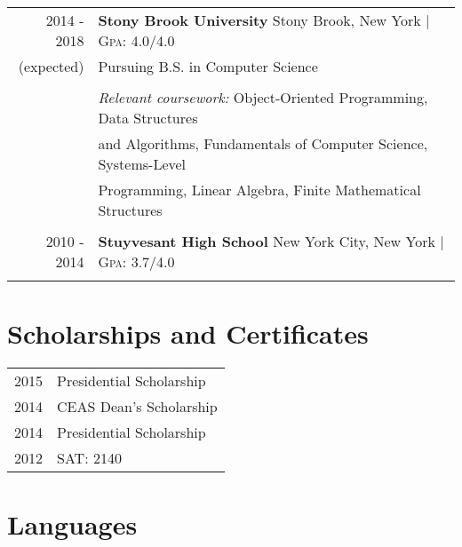 \documentclass[a4paper,10pt]{article} %
\begin{document}
\begin{tabular}{rl}	
\textsc{2014 - 2018} & \textbf{Stony Brook University} Stony Brook, New York | \normalsize \textsc{Gpa}: 4.0/4.0\\
\textsc(expected) & Pursuing B.S. in Computer Science\\
\\
& \textit{Relevant coursework:} Object-Oriented Programming, Data Structures\\
& and Algorithms, Fundamentals of Computer Science, Systems-Level\\
& Programming, Linear Algebra, Finite Mathematical Structures\\

&\\


\textsc{2010 - 2014} & \textbf{Stuyvesant High School} New York City, New York | \normalsize \textsc{Gpa}: 3.7/4.0\\
&\\

\end{tabular}


\section{Scholarships and Certificates}

\begin{tabular}{rl}
\textsc{2015} & Presidential Scholarship \normalsize\\

\textsc{2014} & CEAS Dean's Scholarship \normalsize\\

\textsc{2014} & Presidential Scholarship \normalsize\\

\textsc{2012} & SAT: 2140
\end{tabular}


\section{Languages}
\end{document}
